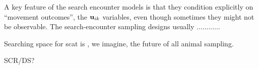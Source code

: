 A key feature of the search encounter models is that they condition
explicitly on ``movement outcomes'', the ${\bf u}_{ik}$ variables,
even though sometimes they might not be observable.
The search-encounter sampling designs usually ............

Searching space for scat is , we imagine, the future of all animal
sampling. 


SCR/DS?